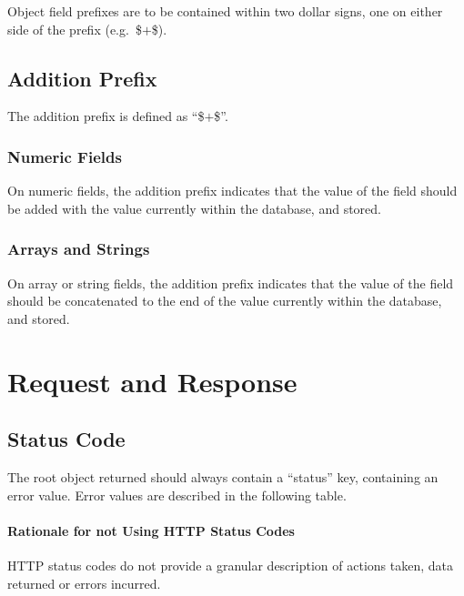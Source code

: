 \documentclass[10pt,letterpaper,titlepage]{report}
\begin{document}
Object field prefixes are to be contained within two dollar signs, one on either side of the prefix (e.g.\ \$$+$\$).

\subsection{Addition Prefix}

The addition prefix is defined as ``\$$+$\$''.

\subsubsection{Numeric Fields}

On numeric fields, the addition prefix indicates that the value of the field should be added with the value currently within the database, and stored.

\subsubsection{Arrays and Strings}

On array or string fields, the addition prefix indicates that the value of the field should be concatenated to the end of the value currently within the database, and stored.

\section{Request and Response}

\subsection{Status Code}

The root object returned should always contain a ``status'' key, containing an error value. Error values are described in the following table.

\paragraph{Rationale for not Using HTTP Status Codes}

HTTP status codes do not provide a granular description of actions taken, data returned or errors incurred.
\end{document}
